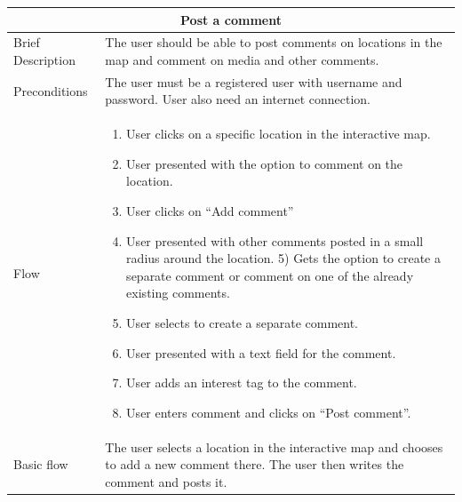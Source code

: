 \begin{minipage}{\linewidth}
\begin{tabular}{|l|p{85mm}|}
  \hline
  \multicolumn{2}{|c|}{\cellcolor{gray!25} \textbf{Post a comment}} \\
  \hline
  Brief Description & The user should be able to post comments on locations in the map and comment on media and other comments.\\
  Preconditions & The user must be a registered user with username and password. User also need an internet connection.\\
  Flow &
    \begin{enumerate}
      \item User clicks on a specific location in the interactive map.
      \item User presented with the option to comment on the location.
      \item User clicks on “Add comment”
      \item User presented with other comments posted in a small radius around the location. 5) Gets the option to create a separate comment or comment on one of the already existing comments.
      \item User selects to create a separate comment.
      \item User presented with a text field for the comment.
      \item User adds an interest tag to the comment.
      \item User enters comment and clicks on “Post comment”.
    \end{enumerate} \\
  Basic flow & The user selects a location in the interactive map and chooses to add a new comment there. The user then writes the comment and posts it.\\
  \hline
\end{tabular}
\end{minipage}

